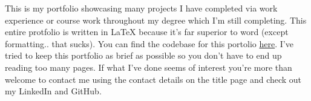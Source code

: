 This is my portfolio showcasing many projects I have completed via work experience or course work throughout my degree which I'm still completing. 
This entire protfolio is written in LaTeX because it's far superior to word (except formatting.. that sucks). You can find the codebase for this 
portolio \href{https://github.com/jackfruittt/Work_Portfolio}{here}. I've tried to keep this portfolio as brief as possible so you don't have to end 
up reading too many pages. If what I've done seems of interest you're more than welcome to contact me using the contact details on the title page and 
check out my LinkedIn and GitHub.
\newpage